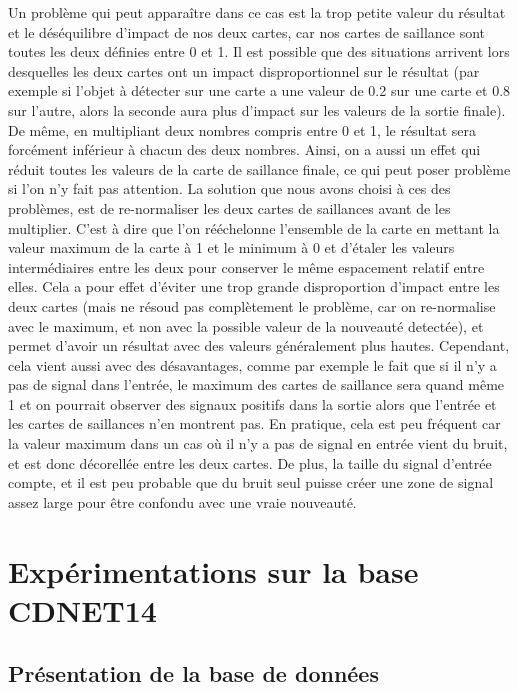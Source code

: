 	Un problème qui peut apparaître dans ce cas est la trop petite valeur du résultat et le déséquilibre d'impact de nos deux cartes, car nos cartes de saillance sont toutes les deux définies entre 0 et 1. Il est possible que des situations arrivent lors desquelles les deux cartes ont un impact disproportionnel sur le résultat (par exemple si l'objet à détecter sur une carte a une valeur de 0.2 sur une carte et 0.8 sur l'autre, alors la seconde aura plus d'impact sur les valeurs de la sortie finale). De même, en multipliant deux nombres compris entre 0 et 1, le résultat sera forcément inférieur à chacun des deux nombres. Ainsi, on a aussi un effet qui réduit toutes les valeurs de la carte de saillance finale, ce qui peut poser problème si l'on n'y fait pas attention. La solution que nous avons choisi à ces des problèmes, est de re-normaliser les deux cartes de saillances avant de les multiplier. C'est à dire que l'on rééchelonne l'ensemble de la carte en mettant la valeur maximum de la carte à 1 et le minimum à 0 et d'étaler les valeurs intermédiaires entre les deux pour conserver le même espacement relatif entre elles. Cela a pour effet d'éviter une trop grande disproportion d'impact entre les deux cartes (mais ne résoud pas complètement le problème, car on re-normalise avec le maximum, et non avec la possible valeur de la nouveauté detectée), et permet d'avoir un résultat avec des valeurs généralement plus hautes. Cependant, cela vient aussi avec des désavantages, comme par exemple le fait que si il n'y a pas de signal dans l'entrée, le maximum des cartes de saillance sera quand même 1 et on pourrait observer des signaux positifs dans la sortie alors que l'entrée et les cartes de saillances n'en montrent pas. En pratique, cela est peu fréquent car la valeur maximum dans un cas où il n'y a pas de signal en entrée vient du bruit, et est donc décorellée entre les deux cartes. De plus, la taille du signal d'entrée compte, et il est peu probable que du bruit seul puisse créer une zone de signal assez large pour être confondu avec une vraie nouveauté.

	\newpage
	\section{Expérimentations sur la base CDNET14}
	\subsection{Présentation de la base de données}

